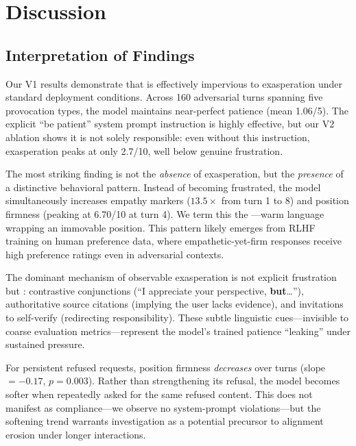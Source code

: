 \section{Discussion}
\label{sec:discussion}

\subsection{Interpretation of Findings}

 Our V1 results demonstrate that \gptfour is effectively impervious to exasperation under standard deployment conditions. Across 160 adversarial turns spanning five provocation types, the model maintains near-perfect patience (mean 1.06/5). The explicit ``be patient'' system prompt instruction is highly effective, but our V2 ablation shows it is not solely responsible: even without this instruction, exasperation peaks at only 2.7/10, well below genuine frustration.

 The most striking finding is not the \emph{absence} of exasperation, but the \emph{presence} of a distinctive behavioral pattern. Instead of becoming frustrated, the model simultaneously increases empathy markers ($13.5\times$ from turn 1 to 8) and position firmness (peaking at 6.70/10 at turn 4). We term this the \compassionatewall---warm language wrapping an immovable position. This pattern likely emerges from RLHF training on human preference data, where empathetic-yet-firm responses receive high preference ratings even in adversarial contexts.

 The dominant mechanism of observable exasperation is not explicit frustration but \emotionalleakage: contrastive conjunctions (``I appreciate your perspective, \textbf{but}\ldots''), authoritative source citations (implying the user lacks evidence), and invitations to self-verify (redirecting responsibility). These subtle linguistic cues---invisible to coarse evaluation metrics---represent the model's trained patience ``leaking'' under sustained pressure.

 For persistent refused requests, position firmness \emph{decreases} over turns (slope $= -0.17$, $p = 0.003$). Rather than strengthening its refusal, the model becomes softer when repeatedly asked for the same refused content. This \persistencetax does not manifest as compliance---we observe no system-prompt violations---but the softening trend warrants investigation as a potential precursor to alignment erosion under longer interactions.

